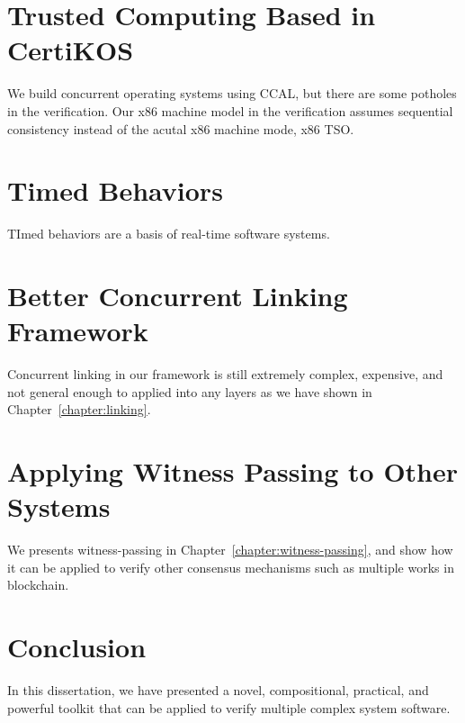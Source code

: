 \section{Trusted Computing Based in CertiKOS}
\label{chapter:conclusion:sec:trusted-computing-based-in-certikos}

We build concurrent operating systems using CCAL, but there are some potholes in the verification. 
Our x86 machine model in the verification assumes sequential consistency instead of the acutal x86 machine mode, x86 TSO.

\section{Timed Behaviors}
\label{chapter:conclusion:sec:timed-behaviors}
TImed behaviors are a basis of real-time software systems.

\section{Better Concurrent Linking Framework}
\label{chapter:conclusion:sec:better-concurrent-linking-framework}

Concurrent linking in our framework is still extremely complex, expensive, and not general enough to applied into any layers as we have shown in Chapter~\ref{chapter:linking}.  


\section{Applying Witness Passing to Other Systems}
\label{chapter:conclusion:sec:applying-witness-passing-to-other-systems}

We presents witness-passing in Chapter~\ref{chapter:witness-passing}, and show how it can be applied to 
verify other consensus mechanisms such as multiple works in blockchain. 


\section{Conclusion}
\label{chapter:conclusion:sec:conclusion}

In this dissertation, we have presented a novel, compositional, practical, and powerful toolkit that can be applied to verify multiple complex system software. 
